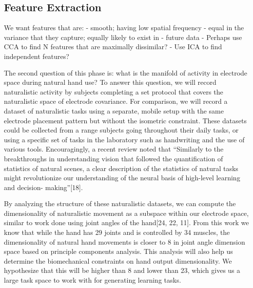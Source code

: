 \documentclass[
  a4paper,
]{article}
\begin{document}
\hypertarget{feature-extraction}{%
\subsection{Feature Extraction}\label{feature-extraction}}

We want features that are: - smooth; having low spatial frequency -
equal in the variance that they capture; equally likely to exist in -
future data - Perhaps use CCA to find N features that are maximally
dissimilar? - Use ICA to find independent features?

The second question of this phase is: what is the manifold of activity
in electrode space during natural hand use? To answer this question, we
will record naturalistic activity by subjects completing a set protocol
that covers the naturalistic space of electrode covariance. For
comparison, we will record a dataset of naturalistic tasks using a
separate, mobile setup with the same electrode placement pattern but
without the isometric constraint. These datasets could be collected from
a range subjects going throughout their daily tasks, or using a specific
set of tasks in the laboratory such as handwriting and the use of
various tools. Encouragingly, a recent review noted that ``Similarly to
the breakthroughs in understanding vision that followed the
quantification of statistics of natural scenes, a clear description of
the statistics of natural tasks might revolutionize our understanding of
the neural basis of high-level learning and decision- making''{[}18{]}.

By analyzing the structure of these naturalistic datasets, we can
compute the dimensionality of naturalistic movement as a subspace within
our electrode space, similar to work done using joint angles of the
hand{[}24, 22, 11{]}. From this work we know that while the hand has 29
joints and is controlled by 34 muscles, the dimensionality of natural
hand movements is closer to 8 in joint angle dimension space based on
principle components analysis. This analysis will also help us determine
the biomechanical constraints on hand output dimensionality. We
hypothesize that this will be higher than 8 and lower than 23, which
gives us a large task space to work with for generating learning tasks.
\end{document}
